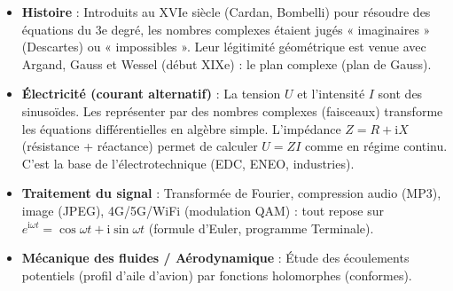 \documentclass[11pt]{article}
\begin{document}
\begin{savaistu}
\begin{itemize}
\item \textbf{Histoire} : Introduits au XVIe siècle (Cardan, Bombelli) pour résoudre des équations du 3e degré, les nombres complexes étaient jugés « imaginaires » (Descartes) ou « impossibles ». Leur légitimité géométrique est venue avec Argand, Gauss et Wessel (début XIXe) : le plan complexe (plan de Gauss).
\item \textbf{Électricité (courant alternatif)} : La tension $U$ et l'intensité $I$ sont des sinusoïdes. Les représenter par des nombres complexes (faisceaux) transforme les équations différentielles en algèbre simple. L'impédance $Z = R + \mathrm{i}X$ (résistance + réactance) permet de calculer $U = ZI$ comme en régime continu. C'est la base de l'électrotechnique (EDC, ENEO, industries).
\item \textbf{Traitement du signal} : Transformée de Fourier, compression audio (MP3), image (JPEG), 4G/5G/WiFi (modulation QAM) : tout repose sur $e^{\mathrm{i}\omega t} = \cos\omega t + \mathrm{i}\sin\omega t$ (formule d'Euler, programme Terminale).
\item \textbf{Mécanique des fluides / Aérodynamique} : Étude des écoulements potentiels (profil d'aile d'avion) par fonctions holomorphes (conformes).
\end{itemize}
\end{savaistu}
\end{document}
